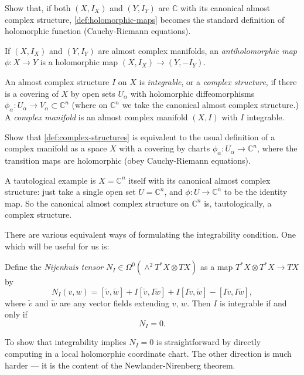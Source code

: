 \documentclass[12pt,letterpaper,reqno]{article}
\numberwithin{equation}{section}
\newcommand{\C}{\ensuremath{\mathbb C}}
\newcommand{\ti}[1]{\textit{#1}}
\begin{document}
\begin{exercise} Show that, if both $(X,I_X)$ and $(Y,I_Y)$ are $\C$ with its canonical 
almost complex structure, \autoref{def:holomorphic-maps} becomes the standard
definition of holomorphic function (Cauchy-Riemann equations).
\end{exercise}

\begin{defn} \label{def:antiholomorphic-maps} If $(X,I_X)$ and $(Y,I_Y)$ are almost
complex manifolds, an \ti{antiholomorphic map} $\phi: X \to Y$
is a holomorphic map $(X,I_X) \to (Y,-I_Y)$.
\end{defn}

\begin{defn} \label{def:complex-structures} An almost complex structure $I$ on $X$ is \ti{integrable}, 
or a \ti{complex structure}, if there is a covering of $X$ by open sets $U_\alpha$ with holomorphic diffeomorphisms $\phi_\alpha: U_\alpha \to V_\alpha \subset \C^n$ (where on $\C^n$ we take the
canonical almost complex structure.) A \ti{complex manifold} is an almost complex manifold $(X,I)$ with $I$ integrable.
\end{defn}

\begin{exercise} Show that \autoref{def:complex-structures} is equivalent to the usual definition of a complex manifold as a space
$X$ with a covering by charts $\phi_\alpha: U_\alpha \to \C^n$, where the transition maps are holomorphic (obey Cauchy-Riemann equations).
\end{exercise}

\begin{example}[Complex structure on $\C^n$] A tautological example is $X = \C^n$ itself with its 
canonical almost complex structure: just take a single open set $U = \C^n$, and $\phi: U \to \C^n$ to be the identity map. So the canonical almost complex structure on $\C^n$ is, tautologically, a
complex structure.
\end{example}

There are various equivalent ways of formulating the integrability condition. One which will be useful for us is:
\begin{prop} Define the \ti{Nijenhuis tensor} $N_I \in \Omega^0(\wedge^2 T^*X \otimes TX)$ as a map
$T^*X \otimes T^*X \to TX$ by
\begin{equation}
N_I(v,w) = [\tilde v,\tilde w] + I[\tilde v,I \tilde w] + I[I \tilde v, \tilde w] - [I\tilde v,I\tilde w],
\end{equation}
where $\tilde v$ and $\tilde w$ are any vector fields extending $v$, $w$.
Then $I$ is integrable if and only if
\begin{equation}
N_I = 0.  
\end{equation}
\end{prop}
\begin{pf} To show that integrability implies $N_I = 0$ is straightforward
by directly computing in a local holomorphic coordinate 
chart. The other direction
is much harder --- it is the content of the Newlander-Nirenberg theorem.
\end{pf}
\end{document}
